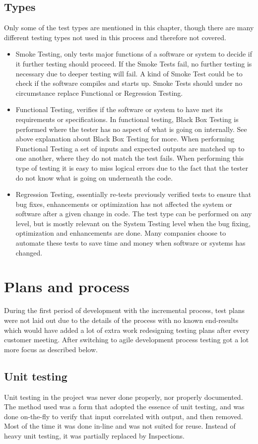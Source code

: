 \subsection{Types}
Only some of the test types are mentioned in this chapter, though there are many different testing types not used in this process and therefore not covered.
\begin{itemize}
\item Smoke Testing, only tests major functions of a software or system to decide if it further testing should proceed. If the Smoke Tests fail, no further testing is necessary due to deeper testing will fail. A kind of Smoke Test could be to check if the software compiles and starts up. Smoke Tests should under no circumstance replace Functional or Regression Testing.
\item Functional Testing, verifies if the software or system to have met its requirements or specifications. In functional testing, Black Box Testing is performed where the tester has no aspect of what is going on internally. See above explanation about Black Box Testing for more. When performing Functional Testing a set of inputs and expected outputs are matched up to one another, where they do not match the test fails. When performing this type of testing it is easy to miss logical errors due to the fact that the tester do not know what is going on underneath the code.
\item Regression Testing, essentially re-tests previously verified tests to ensure that bug fixes, enhancements or optimization has not affected the system or software after a given change in code. The test type can be performed on any level, but is mostly relevant on the System Testing level when the bug fixing, optimization and enhancements are done. Many companies choose to automate these tests to save time and money when software or systems has changed.
\end{itemize}
\section{Plans and process}
During the first period of development with the incremental process, test plans were not laid out due to the details of the process with no known end-results which would have added a lot of extra work redesigning testing plans after every customer meeting. After switching to agile development process testing got a lot more focus as described below.
\subsection{Unit testing}
Unit testing in the project was never done properly, nor properly documented. The method used was a form that adopted the essence of unit testing, and was done on-the-fly to verify that input correlated with output, and then removed. Most of the time it was done in-line and was not suited for reuse. Instead of heavy unit testing, it was partially replaced by Inspections.
